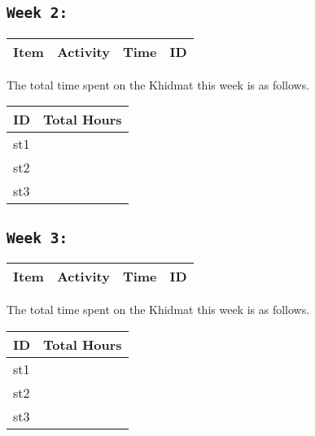 \documentclass{article}
\begin{document}
\subsection{\texttt{Week 2: }}
\begin{center}
\begin{tabular}{|l|l|l|l|}
  \hline
  \textbf{Item} 	& \textbf{Activity} & \textbf{Time} & \textbf{ID} \\\hline
  
\end{tabular}
    
\end{center}
The total time spent on the Khidmat this week is as follows.    
\begin{center}
    
\begin{tabular}{|l|l|}
  \hline
  \textbf{ID} & \textbf{Total Hours}\\\hline
  st1 & \\\hline
  st2 & \\\hline
  st3 & \\\hline
\end{tabular}
\end{center}
\newpage
\subsection{\texttt{Week 3: }}
\begin{center}
\begin{tabular}{|l|l|l|l|}
  \hline
  \textbf{Item} 	& \textbf{Activity} & \textbf{Time} & \textbf{ID} \\\hline
  
\end{tabular}
    
\end{center}
The total time spent on the Khidmat this week is as follows.    
\begin{center}
    
\begin{tabular}{|l|l|}
  \hline
  \textbf{ID} & \textbf{Total Hours}\\\hline
  st1 & \\\hline
  st2 & \\\hline
  st3 & \\\hline
\end{tabular}
\end{center}
\newpage
\end{document}
